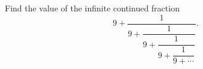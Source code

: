 Find the value of the infinite continued fraction
\[9+\dfrac{1}{9+\dfrac{1}{9+\dfrac{1}{9+\dfrac{1}{9+\cdots}}}}.\]
